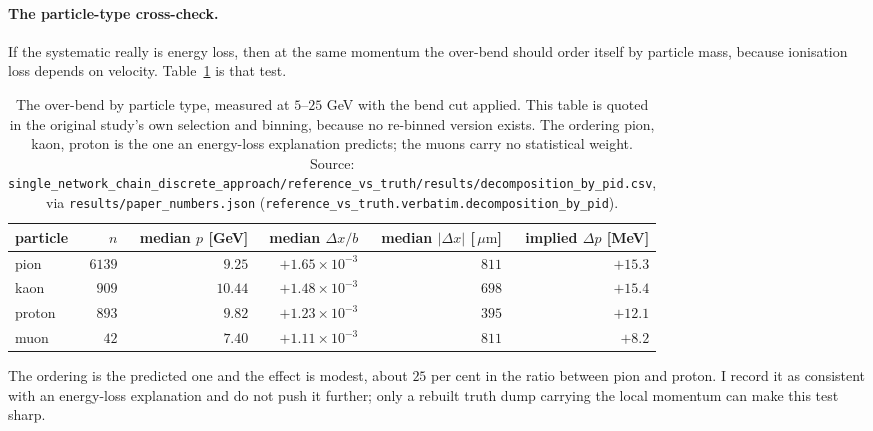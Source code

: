 \documentclass[11pt,a4paper]{article}
\newcommand{\um}{\ensuremath{\,\mu\mathrm{m}}}
\begin{document}
\paragraph{The particle-type cross-check.} If the systematic really is energy
loss, then at the same momentum the over-bend should order itself by particle
mass, because ionisation loss depends on velocity. Table~\ref{tab:pid} is that
test.

\begin{table}[tbp]
  \centering
  \caption{The over-bend by particle type, measured at $5$--$25$ GeV with the
  bend cut applied. This table is quoted in the original study's own selection
  and binning, because no re-binned version exists. The ordering pion, kaon,
  proton is the one an energy-loss explanation predicts; the muons carry no
  statistical weight. Source:
  \texttt{single\_network\_chain\_discrete\_approach/}\allowbreak\texttt{reference\_vs\_truth/results/decomposition\_by\_pid.csv},
  via \texttt{results/paper\_numbers.json}
  (\texttt{reference\_vs\_truth.verbatim.decomposition\_by\_pid}).}
  \label{tab:pid}
  \small
  \setlength{\tabcolsep}{6pt}
  \begin{tabular}{lrrrrr}
    \toprule
    particle & $n$ & median $p$ [GeV] & median $\Delta x / b$
      & median $|\Delta x|$ [\um] & implied $\Delta p$ [MeV] \\
    \midrule
    pion   & $6139$ & $9.25$  & $+1.65\times 10^{-3}$ & $811$ & $+15.3$ \\
    kaon   & $909$  & $10.44$ & $+1.48\times 10^{-3}$ & $698$ & $+15.4$ \\
    proton & $893$  & $9.82$  & $+1.23\times 10^{-3}$ & $395$ & $+12.1$ \\
    muon   & $42$   & $7.40$  & $+1.11\times 10^{-3}$ & $811$ & $+8.2$  \\
    \bottomrule
  \end{tabular}
\end{table}

The ordering is the predicted one and the effect is modest, about $25$ per cent
in the ratio between pion and proton. I record it as consistent with an
energy-loss explanation and do not push it further; only a rebuilt truth dump
carrying the local momentum can make this test sharp.
\end{document}
